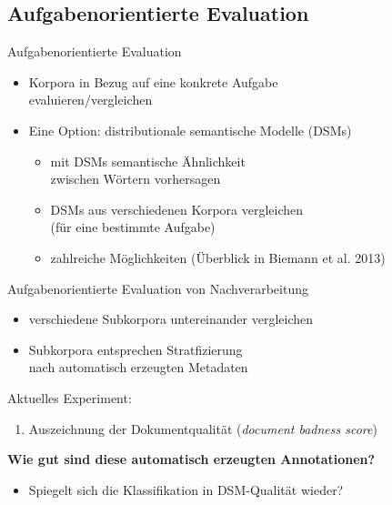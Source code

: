 

\subsection{Aufgabenorientierte Evaluation}

\begin{frame}{Aufgabenorientierte Evaluation}

\begin{itemize}
\item Korpora in Bezug auf eine konkrete Aufgabe\\evaluieren\slash vergleichen
\item Eine Option: distributionale semantische Modelle (DSMs)
  \begin{itemize}
  \item mit DSMs semantische Ähnlichkeit\\zwischen Wörtern vorhersagen 
  \item DSMs aus verschiedenen Korpora vergleichen\\(für eine bestimmte Aufgabe)  
  \item zahlreiche Möglichkeiten (Überblick in Biemann et al. 2013)
  \end{itemize}
\end{itemize}  
\end{frame}


\begin{frame}
	{Aufgabenorientierte Evaluation von Nachverarbeitung}
	\begin{itemize}
		\item verschiedene Subkorpora untereinander vergleichen
		\item Subkorpora entsprechen Stratfizierung\\nach automatisch erzeugten Metadaten
	\end{itemize}
	\pause
	Aktuelles Experiment:
   \begin{enumerate}
    \item Auszeichnung der Dokumentqualität (\textit{document badness score})
  	\end{enumerate}
	\pause
	\vspace{.3cm}
	\textbf{Wie gut sind diese automatisch erzeugten Annotationen?}
	\begin{itemize}
	\item Spiegelt sich die Klassifikation in DSM-Qualität wieder?
	\end{itemize}
\end{frame}


